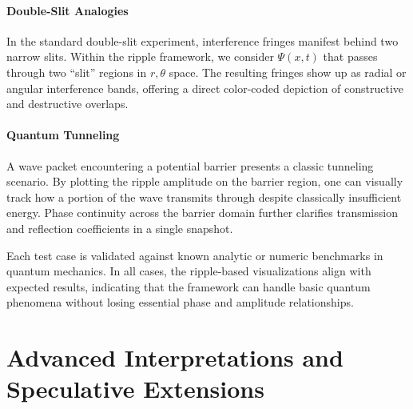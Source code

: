 \documentclass[11pt]{article}
\begin{document}
\paragraph{Double-Slit Analogies}
In the standard double-slit experiment, interference fringes 
manifest behind two narrow slits. Within the ripple framework, 
we consider \(\Psi(x, t)\) that passes through two ``slit'' 
regions in \(r,\theta\) space. The resulting fringes show up 
as radial or angular interference bands, offering a direct 
color-coded depiction of constructive and destructive overlaps.

\paragraph{Quantum Tunneling}
A wave packet encountering a potential barrier presents a classic 
tunneling scenario. By plotting the ripple amplitude on the 
barrier region, one can visually track how a portion of the wave 
transmits through despite classically insufficient energy. 
Phase continuity across the barrier domain further clarifies 
transmission and reflection coefficients in a single snapshot.

Each test case is validated against known analytic or numeric 
benchmarks in quantum mechanics. In all cases, the ripple-based 
visualizations align with expected results, indicating that 
the framework can handle basic quantum phenomena without 
losing essential phase and amplitude relationships.

\section{Advanced Interpretations and Speculative Extensions}
\label{sec:advanced-interpretations}
\end{document}
